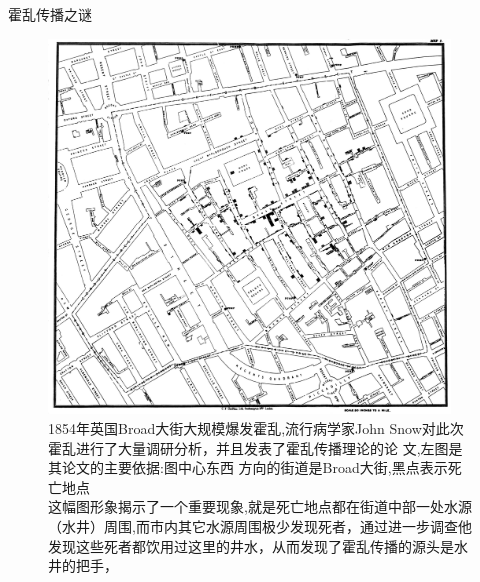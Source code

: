 \documentclass{beamerthemeMono}
\begin{document}
\begin{frame}{\subsecname}{霍乱传播之谜}

  \begin{figure}
    \begin{columns}
      \begin{column}{.6\textwidth}
        \includegraphics[width=\columnwidth]{Snow_cholera_map.jpg}
      \end{column}

      \begin{column}{.35\textwidth}
        \centering
        \caption{1854年英国Broad大街大规模爆发霍乱,流行病学家John
          Snow对此次霍乱进行了大量调研分析，并且发表了霍乱传播理论的论
          文,左图是其论文的主要依据:图中心东西
          方向的街道是Broad大街,黑点表示死亡地点\\
          这幅图形象揭示了一个重要现象,就是死亡地点都在街道中部一处水源
          （水井）周围,而市内其它水源周围极少发现死者，通过进一步调查他
          发现这些死者都饮用过这里的井水，从而发现了霍乱传播的源头是水
          井的把手，}
      \end{column}
    \end{columns}
  \end{figure}

\end{frame}
\end{document}
